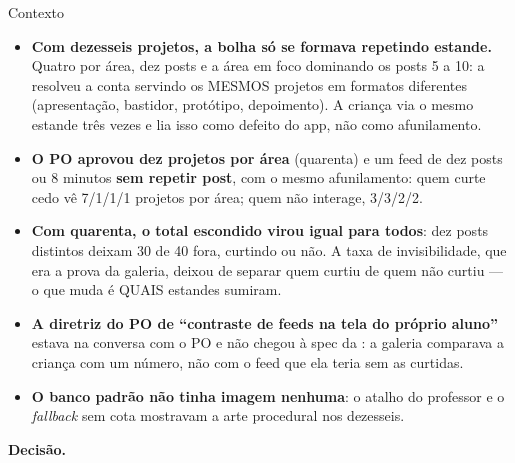 \begin{especificacao}{Contexto}
\begin{itemize}
  \item \textbf{Com dezesseis projetos, a bolha só se formava repetindo
    estande.} Quatro por área, dez posts e a área em foco dominando os posts 5
    a 10: a  resolveu a conta servindo os MESMOS projetos em
    formatos diferentes (apresentação, bastidor, protótipo, depoimento). A
    criança via o mesmo estande três vezes e lia isso como defeito do app, não
    como afunilamento.
  \item \textbf{O PO aprovou dez projetos por área} (quarenta) e um feed de dez
    posts ou 8 minutos \textbf{sem repetir post}, com o mesmo afunilamento:
    quem curte cedo vê 7/1/1/1 projetos por área; quem não interage, 3/3/2/2.
  \item \textbf{Com quarenta, o total escondido virou igual para todos}: dez
    posts distintos deixam 30 de 40 fora, curtindo ou não. A taxa de
    invisibilidade, que era a prova da galeria, deixou de separar quem curtiu
    de quem não curtiu --- o que muda é QUAIS estandes sumiram.
  \item \textbf{A diretriz do PO de \enquote{contraste de feeds na tela do
    próprio aluno}} estava na conversa com o PO e não chegou à spec da
    : a galeria comparava a criança com um número, não com o
    feed que ela teria sem as curtidas.
  \item \textbf{O banco padrão não tinha imagem nenhuma}: o atalho do professor
    e o \emph{fallback} sem cota mostravam a arte procedural nos dezesseis.
\end{itemize}
\end{especificacao}

\textbf{Decisão.}

